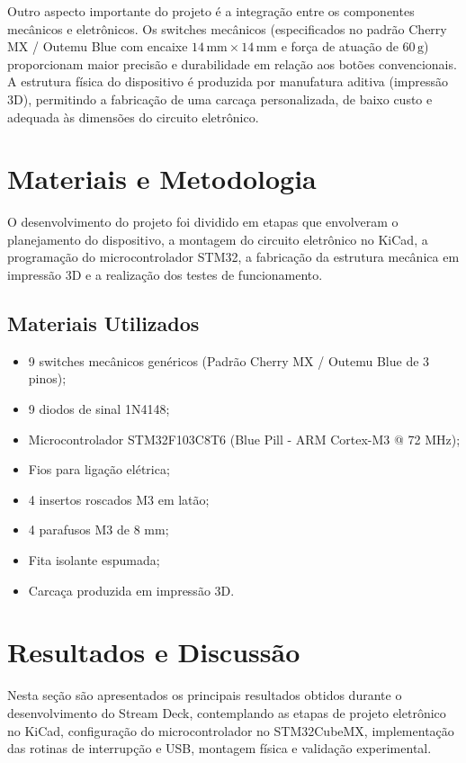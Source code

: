 \documentclass[12pt, a4paper]{article}
\begin{document}
Outro aspecto importante do projeto é a integração entre os componentes mecânicos e eletrônicos. Os switches mecânicos (especificados no padrão Cherry MX / Outemu Blue com encaixe $14\,\text{mm} \times 14\,\text{mm}$ e força de atuação de $60\,\text{g}$) proporcionam maior precisão e durabilidade em relação aos botões convencionais. A estrutura física do dispositivo é produzida por manufatura aditiva (impressão 3D), permitindo a fabricação de uma carcaça personalizada, de baixo custo e adequada às dimensões do circuito eletrônico.

\section{Materiais e Metodologia}
\hspace*{1.25cm}O desenvolvimento do projeto foi dividido em etapas que envolveram o planejamento do dispositivo, a montagem do circuito eletrônico no KiCad, a programação do microcontrolador STM32, a fabricação da estrutura mecânica em impressão 3D e a realização dos testes de funcionamento.

\subsection{Materiais Utilizados}
\begin{itemize}
    \item 9 switches mecânicos genéricos (Padrão Cherry MX / Outemu Blue de 3 pinos);
    \item 9 diodos de sinal 1N4148;
    \item Microcontrolador STM32F103C8T6 (Blue Pill - ARM Cortex-M3 @ 72 MHz);
    \item Fios para ligação elétrica;
    \item 4 insertos roscados M3 em latão;
    \item 4 parafusos M3 de 8 mm;
    \item Fita isolante espumada;
    \item Carcaça produzida em impressão 3D.
\end{itemize}

\section{Resultados e Discussão}
\hspace*{1.25cm}Nesta seção são apresentados os principais resultados obtidos durante o desenvolvimento do Stream Deck, contemplando as etapas de projeto eletrônico no KiCad, configuração do microcontrolador no STM32CubeMX, implementação das rotinas de interrupção e USB, montagem física e validação experimental.
\end{document}
